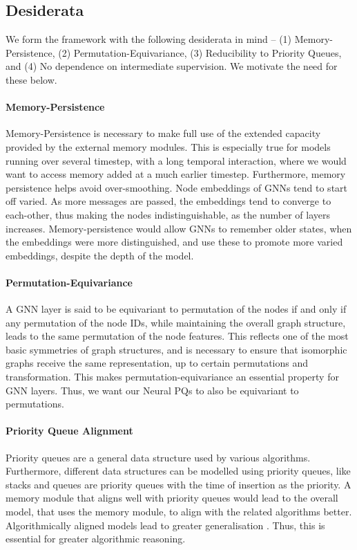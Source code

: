 \documentclass{article}
\theoremstyle{plain}
\theoremstyle{definition}
\theoremstyle{remark}
\begin{document}
\subsection{Desiderata}
We form the framework with the following desiderata in mind -- (1) Memory-Persistence, (2) Permutation-Equivariance, (3) Reducibility to Priority Queues,
and (4) No dependence on intermediate supervision. We motivate the need for these below.

\paragraph{Memory-Persistence} Memory-Persistence is necessary to make full use of the extended capacity provided by the external memory modules.
This is especially true for models running over several timestep, with a long temporal interaction, where we would want to access memory added at a much earlier timestep.
Furthermore, memory persistence helps avoid over-smoothing. Node embeddings of GNNs tend to start off varied. As more messages are passed, the embeddings
tend to converge to each-other, thus making the nodes indistinguishable, as the number of layers increases.
Memory-persistence would allow GNNs to remember older states, when the embeddings were more distinguished, and use these to promote more varied embeddings,
despite the depth of the model.

\paragraph{Permutation-Equivariance} A GNN layer is said to be equivariant to permutation of the nodes if and only if any permutation of the node IDs, while maintaining
the overall graph structure, leads to the same permutation of the node features. This reflects one of the most basic symmetries of graph structures, and is necessary
to ensure that isomorphic graphs receive the same representation, up to certain permutations and transformation. This makes permutation-equivariance an essential
property for GNN layers. Thus, we want our Neural PQs to also be equivariant to permutations.

\paragraph{Priority Queue Alignment} Priority queues are a general data structure used by various algorithms. Furthermore, different data structures can be modelled using
priority queues, like stacks and queues are priority queues with the time of insertion as the priority. A memory module that aligns well with priority queues would lead
to the overall model, that uses the memory module, to align with the related algorithms better. Algorithmically aligned models lead to greater generalisation
\citep{Xu-Neural-Networks-Reasoning}. Thus, this is essential for greater algorithmic reasoning.
\end{document}
